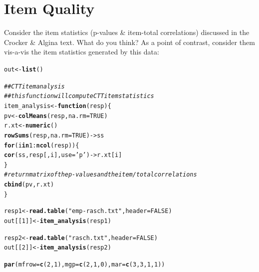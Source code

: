 \documentclass[letterpaper,12pt]{article}\usepackage[]{graphicx}\usepackage[]{color}
\makeatletter
\newcommand{\hlnum}[1]{\textcolor[rgb]{0.686,0.059,0.569}{#1}}%
\newcommand{\hlstr}[1]{\textcolor[rgb]{0.192,0.494,0.8}{#1}}%
\newcommand{\hlcom}[1]{\textcolor[rgb]{0.678,0.584,0.686}{\textit{#1}}}%
\newcommand{\hlopt}[1]{\textcolor[rgb]{0,0,0}{#1}}%
\newcommand{\hlstd}[1]{\textcolor[rgb]{0.345,0.345,0.345}{#1}}%
\newcommand{\hlkwa}[1]{\textcolor[rgb]{0.161,0.373,0.58}{\textbf{#1}}}%
\newcommand{\hlkwb}[1]{\textcolor[rgb]{0.69,0.353,0.396}{#1}}%
\newcommand{\hlkwc}[1]{\textcolor[rgb]{0.333,0.667,0.333}{#1}}%
\newcommand{\hlkwd}[1]{\textcolor[rgb]{0.737,0.353,0.396}{\textbf{#1}}}%
\newenvironment{kframe}{%
 \def\at@end@of@kframe{}%
 \ifinner\ifhmode%
  \def\at@end@of@kframe{\end{minipage}}%
  \begin{minipage}{\columnwidth}%
 \fi\fi%
 \def\FrameCommand##1{\hskip\@totalleftmargin \hskip-\fboxsep
 \colorbox{shadecolor}{##1}\hskip-\fboxsep
     \hskip-\linewidth \hskip-\@totalleftmargin \hskip\columnwidth}%
 \MakeFramed {\advance\hsize-\width
   \@totalleftmargin\z@ \linewidth\hsize
   \@setminipage}}%
 {\par\unskip\endMakeFramed%
 \at@end@of@kframe}
\newenvironment{knitrout}{}{} %
\numberwithin{equation}{section}
\makeatother
\begin{document}
\pagebreak
\section{Item Quality}

Consider the item statistics (p-values \& item-total correlations) discussed in the Crocker \& Algina text. What do you think? As a point of contrast, consider them vis-a-vis the item statistics generated by this data:

\begin{knitrout}
\color{fgcolor}\begin{kframe}
\begin{alltt}
\hlstd{out}\hlkwb{<-}\hlkwd{list}\hlstd{()}

\hlcom{##CTT item analysis}
\hlcom{##this function will compute CTT item statistics}
\hlstd{item_analysis}\hlkwb{<-}\hlkwa{function}\hlstd{(}\hlkwc{resp}\hlstd{) \{}
    \hlstd{pv}\hlkwb{<-}\hlkwd{colMeans}\hlstd{(resp,}\hlkwc{na.rm}\hlstd{=}\hlnum{TRUE}\hlstd{)}
    \hlstd{r.xt}\hlkwb{<-}\hlkwd{numeric}\hlstd{()}
    \hlkwd{rowSums}\hlstd{(resp,}\hlkwc{na.rm}\hlstd{=}\hlnum{TRUE}\hlstd{)}\hlkwb{->}\hlstd{ss}
    \hlkwa{for} \hlstd{(i} \hlkwa{in} \hlnum{1}\hlopt{:}\hlkwd{ncol}\hlstd{(resp)) \{}
        \hlkwd{cor}\hlstd{(ss,resp[,i],}\hlkwc{use}\hlstd{=}\hlstr{'p'}\hlstd{)}\hlkwb{->}\hlstd{r.xt[i]}
    \hlstd{\}}
    \hlcom{#return matrix of the p-values and the item/total correlations}
    \hlkwd{cbind}\hlstd{(pv,r.xt)}
\hlstd{\}}

\hlstd{resp1} \hlkwb{<-}\hlkwd{read.table}\hlstd{(}\hlstr{"emp-rasch.txt"}\hlstd{,}\hlkwc{header}\hlstd{=}\hlnum{FALSE}\hlstd{)}
\hlstd{out[[}\hlnum{1}\hlstd{]]}\hlkwb{<-}\hlkwd{item_analysis}\hlstd{(resp1)}

\hlstd{resp2} \hlkwb{<-}\hlkwd{read.table}\hlstd{(}\hlstr{"rasch.txt"}\hlstd{,}\hlkwc{header}\hlstd{=}\hlnum{FALSE}\hlstd{)}
\hlstd{out[[}\hlnum{2}\hlstd{]]}\hlkwb{<-}\hlkwd{item_analysis}\hlstd{(resp2)}

\hlkwd{par}\hlstd{(}\hlkwc{mfrow}\hlstd{=}\hlkwd{c}\hlstd{(}\hlnum{2}\hlstd{,}\hlnum{1}\hlstd{),}\hlkwc{mgp}\hlstd{=}\hlkwd{c}\hlstd{(}\hlnum{2}\hlstd{,}\hlnum{1}\hlstd{,}\hlnum{0}\hlstd{),}\hlkwc{mar}\hlstd{=}\hlkwd{c}\hlstd{(}\hlnum{3}\hlstd{,}\hlnum{3}\hlstd{,}\hlnum{1}\hlstd{,}\hlnum{1}\hlstd{))}


\end{alltt}
\end{kframe}
\end{knitrout}
\end{document}

